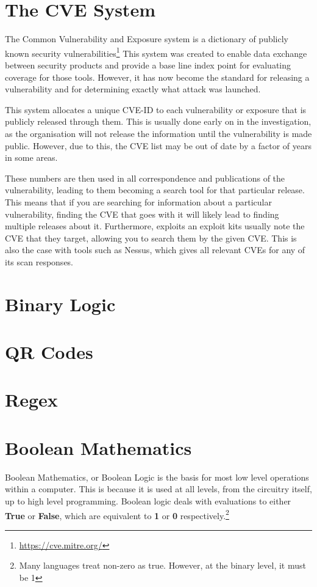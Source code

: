 \documentclass[a4paper,11pt]{report}
\begin{document}
	\section{The CVE System}
		The Common Vulnerability and Exposure system is a dictionary of publicly known security vulnerabilities\footnote{\url{https://cve.mitre.org/}}
		This system was created to enable data exchange between security products and provide a base line index point for evaluating coverage for those tools. 
		However, it has now become the standard for releasing a vulnerability and for determining exactly what attack was launched. 

		This system allocates a unique CVE-ID to each vulnerability or exposure that is publicly released through them. 
		This is usually done early on in the investigation, as the organisation will not release the information until the vulnerability is made public. 
		However, due to this, the CVE list may be out of date by a factor of years in some areas. 

		These numbers are then used in all correspondence and publications of the vulnerability, leading to them becoming a search tool for that particular release. 
		This means that if you are searching for information about a particular vulnerability, finding the CVE that goes with it will likely lead to finding multiple releases about it. 
		Furthermore, exploits an exploit kits usually note the CVE that they target, allowing you to search them by the given CVE. 
		This is also the case with tools such as Nessus, which gives all relevant CVEs for any of its scan responses. 

		
	\section{Binary Logic}
	\section{QR Codes}
	\section{Regex}
	\section{Boolean Mathematics}
		Boolean Mathematics, or Boolean Logic is the basis for most low level operations within a computer. 
		This is because it is used at all levels, from the circuitry itself, up to high level programming. 
		Boolean logic deals with evaluations to either \textbf{True} or \textbf{False}, 
		which are equivalent to \textbf{1} or \textbf{0} respectively.\footnote{Many languages treat non-zero as true. However, at the binary level, it must be 1}
\end{document}
